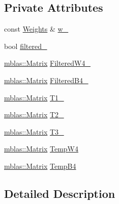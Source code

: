 \subsection*{Private Attributes}
\begin{DoxyCompactItemize}
\item 
const \hyperlink{structamunmt_1_1GPU_1_1Weights}{Weights} \& \hyperlink{classamunmt_1_1GPU_1_1Decoder_1_1Softmax_ae2e313f9d4f7b068c99ae73e97f91c41}{w\+\_\+}
\item 
bool \hyperlink{classamunmt_1_1GPU_1_1Decoder_1_1Softmax_a302f14f7a0af6f6f16618ee924f7c30a}{filtered\+\_\+}
\item 
\hyperlink{namespaceamunmt_1_1GPU_1_1mblas_ab67821a8254de53e45a623cf73c0aef6}{mblas\+::\+Matrix} \hyperlink{classamunmt_1_1GPU_1_1Decoder_1_1Softmax_a149cffb41ddd8f888ff26145712f4c7f}{Filtered\+W4\+\_\+}
\item 
\hyperlink{namespaceamunmt_1_1GPU_1_1mblas_ab67821a8254de53e45a623cf73c0aef6}{mblas\+::\+Matrix} \hyperlink{classamunmt_1_1GPU_1_1Decoder_1_1Softmax_a88f462fb02369b2aea533ba0bb36d526}{Filtered\+B4\+\_\+}
\item 
\hyperlink{namespaceamunmt_1_1GPU_1_1mblas_ab67821a8254de53e45a623cf73c0aef6}{mblas\+::\+Matrix} \hyperlink{classamunmt_1_1GPU_1_1Decoder_1_1Softmax_a8a139447e51633e488a436440b21ffe9}{T1\+\_\+}
\item 
\hyperlink{namespaceamunmt_1_1GPU_1_1mblas_ab67821a8254de53e45a623cf73c0aef6}{mblas\+::\+Matrix} \hyperlink{classamunmt_1_1GPU_1_1Decoder_1_1Softmax_a81f4a316db17da624e59deaf9bf72951}{T2\+\_\+}
\item 
\hyperlink{namespaceamunmt_1_1GPU_1_1mblas_ab67821a8254de53e45a623cf73c0aef6}{mblas\+::\+Matrix} \hyperlink{classamunmt_1_1GPU_1_1Decoder_1_1Softmax_a21a82df071c85202f529b7c87b5b597c}{T3\+\_\+}
\item 
\hyperlink{namespaceamunmt_1_1GPU_1_1mblas_ab67821a8254de53e45a623cf73c0aef6}{mblas\+::\+Matrix} \hyperlink{classamunmt_1_1GPU_1_1Decoder_1_1Softmax_af6d96b67f2e1a18b692fc5a0f016e0d0}{Temp\+W4}
\item 
\hyperlink{namespaceamunmt_1_1GPU_1_1mblas_ab67821a8254de53e45a623cf73c0aef6}{mblas\+::\+Matrix} \hyperlink{classamunmt_1_1GPU_1_1Decoder_1_1Softmax_a7e627e54910acdb3b0f02c08e7671d9a}{Temp\+B4}
\end{DoxyCompactItemize}


\subsection{Detailed Description}

